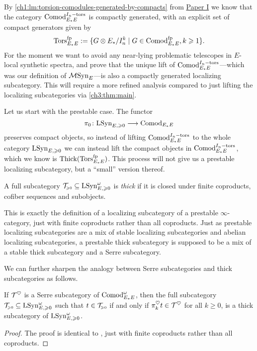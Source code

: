 By \cref{ch1:lm:torsion-comodules-generated-by-compacts} from \hyperref[ch1]{Paper I} we know that the category $\mathrm{Comod}_{E_*E}^{I_n-\mathrm{tors}}$ is compactly generated, with an explicit set of compact generators given by 
\[\mathrm{Tors}_{E_*E}^{\mathrm{fp}} := \{G\otimes E_*/I_n^k \mid G\in \mathrm{Comod}_{E_*E}^{\mathrm{fp}}, k\geqslant 1\}.\]
For the moment we want to avoid any near-lying problematic telescopes in $E$-local synthetic spectra, and prove that the unique lift of $\mathrm{Comod}_{E_*E}^{I_n-\mathrm{tors}}$---which was our definition of $\mathcal{M}\mathrm{Syn}_{E}$---is also a compactly generated localizing subcategory. This will require a more refined analysis compared to just lifting the localizing subcategories via \cref{ch3:thm:main}. 

Let us start with the prestable case. The functor 
\[\pi_0 \colon \mathrm{LSyn}_{E, \geqslant 0} \longrightarrow \mathrm{Comod}_{E_*E}\]
preserves compact objects, so instead of lifting $\mathrm{Comod}_{E_*E}^{I_n-\mathrm{tors}}$ to the whole category $\mathrm{LSyn}_{E, \geqslant 0}$ we can instead lift the compact objects in $\mathrm{Comod}_{E_*E}^{I_n-\mathrm{tors}}$, which we know is $\operatorname{Thick}(\mathrm{Tors}_{E_*E}^{\mathrm{fp}})$. This process will not give us a prestable localizing subcategory, but a ``small'' version thereof. 

\begin{definition}
    A full subcategory $\mathcal{T}_{\hspace{-1pt}\scriptscriptstyle\geqslant 0} \subseteq \mathrm{LSyn}_{E, \geqslant 0}^\omega$ is \emph{thick} if it is closed under finite coproducts, cofiber sequences and subobjects. 
\end{definition}

\begin{remark}
    This is exactly the definition of a localizing subcategory of a prestable $\infty$-category, just with finite coproducts rather than all coproducts. Just as prestable localizing subcategories are a mix of stable localizing subcategories and abelian localizing subcategories, a prestable thick subcategory is supposed to be a mix of a stable thick subcategory and a Serre subcategory. 
\end{remark}

We can further sharpen the analogy between Serre subcategories and thick subcategories as follows. 

\begin{lemma}
    If $\mathcal{T}^\heartsuit$ is a Serre subcategory of $\mathrm{Comod}_{E_*E}^\omega$, then the full subcategory $\mathcal{T}_{\hspace{-1pt}\scriptscriptstyle\geqslant 0}\subseteq \mathrm{LSyn}_{E, \geqslant 0}^\omega$ such that $t\in \mathcal{T}_{\hspace{-1pt}\scriptscriptstyle\geqslant 0}$ if and only if $\pi^\heartsuit_k t \in \mathcal{T}^\heartsuit$ for all $k\geq 0$, is a thick subcategory of $\mathrm{LSyn}_{E, \geqslant 0}^\omega$. 
\end{lemma}
\begin{proof}
    The proof is identical to \cite[C.5.2.7]{lurie_SAG}, just with finite coproducts rather than all coproducts. 
\end{proof}

